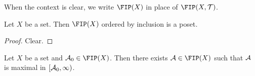 \documentclass{book}
\begin{document}
	\begin{note}
		When the context is clear, we write $\FIP(X)$ in place of $\FIP(X, \MT)$.
	\end{note}

	\begin{ex} 
		Let $X$ be a set. Then $\FIP(X)$ ordered by inclusion is a poset.
	\end{ex}

	\begin{proof}
		Clear.
	\end{proof}

	\begin{ex} 
		Let $X$ be a set and $\MA_0 \in \FIP(X)$. Then there exists $\MA \in \FIP(X)$ such that $\mathcal{A}$ is maximal in $[\mathcal{A}_0, \infty)$. 
	\end{ex}
\end{document}
